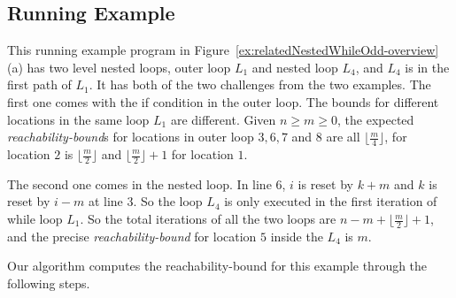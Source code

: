 \subsection{Running Example}

This running example program in Figure~\ref{ex:relatedNestedWhileOdd-overview}(a) has two level nested loops, outer loop $L_1$ and nested loop $L_4$, and $L_4$ is in the first path of $L_1$. It has both of the two challenges from the two examples.
The first one comes with the if condition in the outer loop.
The bounds for different locations in the same loop $L_1$ are different.
Given $n \geq m \geq 0$,
the expected \emph{reachability-bound}s for locations in outer loop $3, 6, 7$ and $8$ are all $\lfloor\frac{m}{4}\rfloor$,
for location $2$ is $\lfloor\frac{m}{2}\rfloor$ and $\lfloor\frac{m}{2}\rfloor + 1$ for location $1$.

The second one comes in the nested loop.
In line 6, $i$ is reset by $k + m$ and $k$ is reset by $i - m$ at line 3. So the
loop $L_4$ is only executed in the first iteration of while loop $L_1$.
So the total iterations of all the two loops are
$n - m + \lfloor\frac{m}{2}\rfloor + 1$,
and the precise \emph{reachability-bound} for location $5$ inside the $L_4$ is $m$.

Our algorithm computes the reachability-bound for this example through the following steps.


